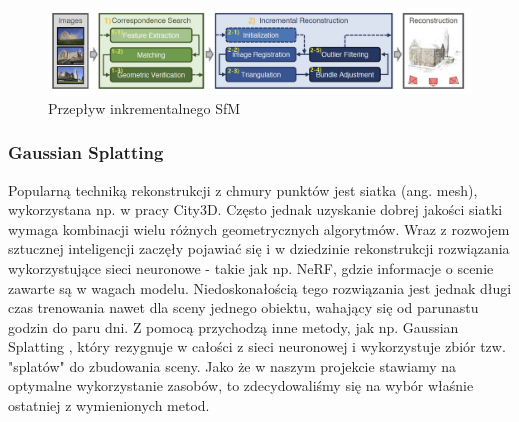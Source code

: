 \begin{figure}[!ht]
  \includegraphics[width=\linewidth]{img/sfm_pipeline.png}
  \caption{Przepływ inkrementalnego SfM}
  \label{fig:sfm_flow}
\end{figure}

\subsubsection{Gaussian Splatting}

Popularną techniką rekonstrukcji z chmury punktów jest siatka (ang. mesh), wykorzystana np. w pracy City3D\cite{city3D}. Często jednak uzyskanie dobrej jakości siatki wymaga kombinacji wielu różnych geometrycznych algorytmów. Wraz z rozwojem sztucznej inteligencji zaczęły pojawiać się i w dziedzinie rekonstrukcji rozwiązania wykorzystujące sieci neuronowe - takie jak np. NeRF\cite{nerf}, gdzie informacje o scenie zawarte są w wagach modelu. Niedoskonałością tego rozwiązania jest jednak długi czas trenowania nawet dla sceny jednego obiektu, wahający się od parunastu godzin do paru dni. Z pomocą przychodzą inne metody, jak np. Gaussian Splatting \cite{gaussiansplatting}, który rezygnuje w całości z sieci neuronowej i wykorzystuje zbiór tzw. "splatów" do zbudowania sceny. Jako że w naszym projekcie stawiamy na optymalne wykorzystanie zasobów, to zdecydowaliśmy się na wybór właśnie ostatniej z wymienionych metod. 

